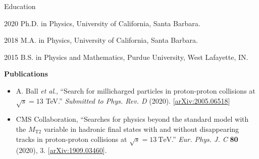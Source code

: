 \begin{vitae}

\begin{vitaesection}{Education}
\vspace{-1mm}
\item [2020] Ph.D. in Physics, University of California, Santa Barbara.
\item [2018] M.A. in Physics, University of California, Santa Barbara.
\item [2015] B.S. in Physics and Mathematics, Purdue University, West Lafayette, IN.
\end{vitaesection}

\vspace{5mm}
\textbf{Publications}


\begin{flushleft}

\begin{itemize}\setlength\itemsep{2mm}
\vspace{-3mm}

\item A. Ball \textit{et al}., ``Search for millicharged particles in proton-proton collisions at $\sqrt{s}=13$ TeV.''
\textit{Submitted to Phys. Rev. D} (2020). [\href{https://arxiv.org/abs/2005.06518}{arXiv:2005.06518}]

\item CMS Collaboration, ``Searches for physics beyond the standard model with the $M_\mathrm{T2}$ variable in hadronic
  final states with and without disappearing tracks in proton-proton collisions at $\sqrt{s}=13~\mathrm{TeV}$.''
  \textit{Eur. Phys. J. C} \textbf{80} (2020), 3.
  [\href{https://arxiv.org/abs/1909.03460}{arXiv:1909.03460}].


\end{itemize}
\end{flushleft}
\end{vitae}
